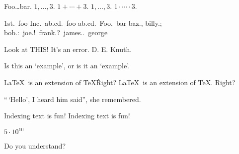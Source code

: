 
\begin{foo} \begin{bar} \end{bar}\end{foo}


Foo\dots bar. $1,\ldots,3$. $1+\cdots+3$. $1,\ldots,3$. $1\cdot\cdots\cdot3$.


1st.\ foo Inc.\ ab.cd.\ foo ab.cd.\ Foo.\ bar baz., billy.; bob.:\ joe.!\ frank.?\ james..\ george


Look at THIS\@! It's an error. D. E. Knuth.


{}


Is this an `example', or is it an `example'.




\LaTeX\ is an extension of \TeX\. Right?
\LaTeX\ is an extension of \TeX. Right?


``\,`Hello', I heard him said'', she remembered.


Indexing text is fun!
Indexing text%
      is fun!


$5\cdot10^{10}$


Do you understand?

